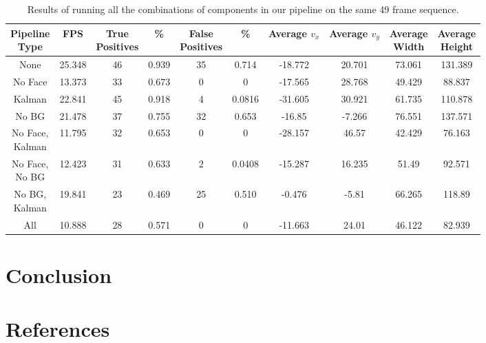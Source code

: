 \documentclass[12pt]{article}
\begin{document}
\noindent
\begin{table}[H]
\begin{center}
\begin{tabular}{|c|c|c|c|c|c|c|c|c|c|}
\hline
\shortstack{Pipeline \\ Type} &		FPS &	\shortstack{True \\ Positives} &	\% &		\shortstack{False \\ Positives }&	 \% &		\shortstack{Average \\ $v_x$} & 	\shortstack{Average \\ $v_y$} & 	\shortstack{Average \\ Width} &	\shortstack{Average \\Height} \\	\hline \hline
None    & 	25.348	  & 	46		        &	0.939     &		35                        &	0.714     &		-18.772 &	20.701 &	73.061 &	131.389	\\ \hline
No Face &	13.373 &	33 &	0.673 &	0 &	0 &	-17.565 &	28.768	& 49.429	& 88.837 \\ \hline
Kalman &	22.841 &	45	&0.918	&4	&0.0816&	-31.605	&30.921	&61.735&	110.878		\\ \hline
No BG	 & 21.478&	37	&0.755	&32	&0.653	&-16.85	&-7.266	&76.551	&137.571		\\ \hline
\shortstack{No Face, \\ Kalman}	&11.795&	32	&0.653&	0	&0&	-28.157	&46.57	&42.429&	76.163	\\ \hline
\shortstack{No Face, \\ No BG}	&12.423&	31	&0.633&	2	&0.0408&	-15.287&	16.235&	51.49&	92.571		\\ \hline
\shortstack{No BG, \\ Kalman}&	19.841&	23&	0.469	&25	&0.510	&-0.476	&-5.81	&66.265&	118.89	\\ \hline
All	&10.888&	28	&0.571&	0	&0	&-11.663&	24.01&	46.122	&82.939 \\
\hline
\end{tabular}
\end{center}
\label{data}
\caption{Results of running all the combinations of components in our pipeline on the same 49 frame sequence.}
\end{table}


\section{Conclusion}

\section{References}
\end{document}
